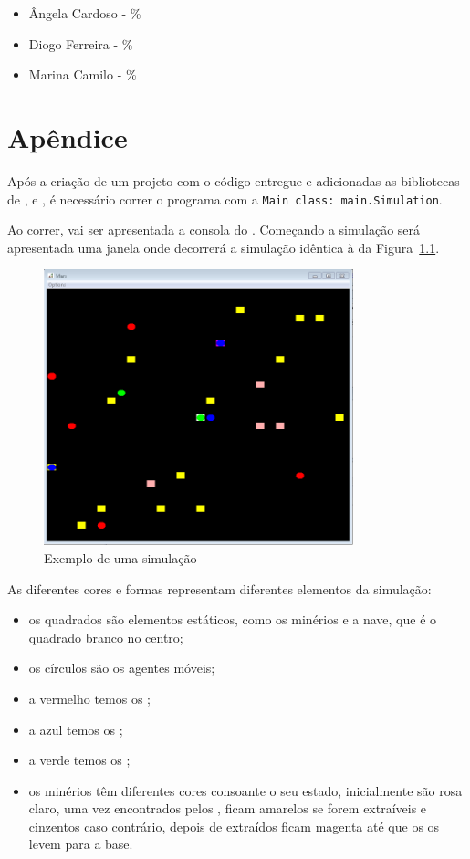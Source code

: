 \documentclass[12pt]{report}
\begin{document}
\begin{itemize}
	\item Ângela Cardoso - \%
	\item Diogo Ferreira - \%
	\item Marina Camilo - \%
\end{itemize}


\chapter{Apêndice}

Após a criação de um projeto \java com o código entregue e adicionadas as bibliotecas de \sajas, \jade e \repast, é necessário correr o programa com a \texttt{Main class: main.Simulation}.

Ao correr, vai ser apresentada a consola do \repast. Começando a simulação será apresentada uma janela onde decorrerá a simulação idêntica à da Figura~\ref{simulacao}.

\begin{figure}[h]
	\centering
	\includegraphics[width=0.8\textwidth]{simulacao}
	\caption{Exemplo de uma simulação}
	\label{simulacao}
\end{figure}

As diferentes cores e formas representam diferentes elementos da simulação:
\begin{itemize}
	\item os quadrados são elementos estáticos, como os minérios e a nave, que é o quadrado branco no centro;
	\item os círculos são os agentes móveis;
	\item a vermelho temos os \spotters;
	\item a azul temos os \producers;
	\item a verde temos os \transporters;
	\item os minérios têm diferentes cores consoante o seu estado, inicialmente são rosa claro, uma vez encontrados pelos \spotters, ficam amarelos se forem extraíveis e cinzentos caso contrário, depois de extraídos ficam magenta até que os \transporters os levem para a base.
\end{itemize}
\end{document}
